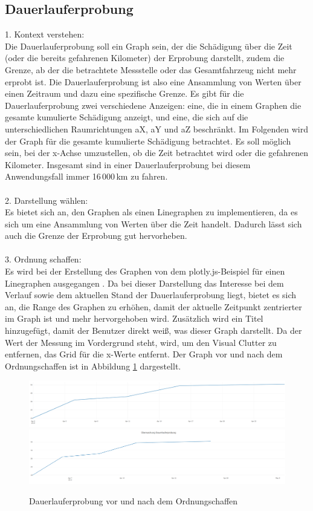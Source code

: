 \subsection{Dauerlauferprobung}
\label{section:dauerlauferprobung}
1. Kontext verstehen:\\
Die Dauerlauferprobung soll ein Graph sein, der die Schädigung über die Zeit (oder die bereits gefahrenen Kilometer) der Erprobung darstellt, zudem die Grenze, ab der die betrachtete Messstelle oder das Gesamtfahrzeug nicht mehr erprobt ist. Die Dauerlauferprobung ist also eine Ansammlung von Werten über einen Zeitraum und dazu eine spezifische Grenze. Es gibt für die Dauerlauferprobung zwei verschiedene Anzeigen: eine, die in einem Graphen die gesamte kumulierte Schädigung anzeigt, und eine, die sich auf die unterschiedlichen Raumrichtungen aX, aY und aZ beschränkt. Im Folgenden wird der Graph für die gesamte kumulierte Schädigung betrachtet. Es soll möglich sein, bei der x-Achse umzustellen, ob die Zeit betrachtet wird oder die gefahrenen Kilometer. Insgesamt sind in einer Dauerlauferprobung bei diesem Anwendungsfall immer 16\,000\,km zu fahren.\\\\
2. Darstellung wählen:\\
Es bietet sich an, den Graphen als einen Linegraphen zu implementieren, da es sich um eine Ansammlung von Werten über die Zeit handelt. Dadurch lässt sich auch die Grenze der Erprobung gut hervorheben.\\\\
 3. Ordnung schaffen:\\
Es wird bei der Erstellung des Graphen von dem plotly.js-Beispiel für einen Linegraphen ausgegangen \cite{Plotly.2024}. Da bei dieser Darstellung das Interesse bei dem Verlauf sowie dem aktuellen Stand der Dauerlauferprobung liegt, bietet es sich an, die Range des Graphen zu erhöhen, damit der aktuelle Zeitpunkt zentrierter im Graph ist und mehr hervorgehoben wird. Zusätzlich wird ein Titel hinzugefügt, damit der Benutzer direkt weiß, was dieser Graph darstellt. Da der Wert der Messung im Vordergrund steht, wird, um den Visual Clutter zu entfernen, das Grid für die x-Werte entfernt. Der Graph vor und nach dem Ordnungschaffen ist in Abbildung \ref{fig:dauerlauferprobung_before} dargestellt.
\begin{figure}[!h]
    \centering
    \includegraphics[width=\linewidth]{gfx/dauerlauferprobung_before.png}
        \includegraphics[width=1\linewidth]{gfx/dauerlauferprobung-after.png}
    \caption{Dauerlauferprobung vor und nach dem Ordnungschaffen}
    \label{fig:dauerlauferprobung_before}
\end{figure}
